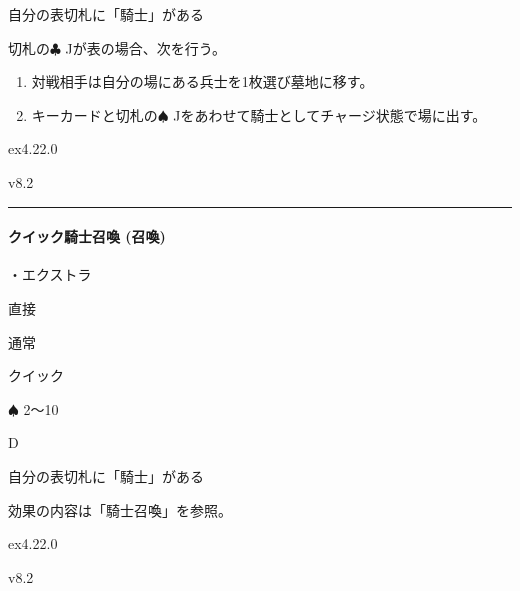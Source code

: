 \documentclass[letterpaper,10pt,dvipdfmx]{sphinxmanual}
\begin{document}
\sphinxAtStartPar
自分の表切札に「騎士」がある

\sphinxAtStartPar
{}

\sphinxAtStartPar
切札の{\normalsize $\clubsuit$} Jが表の場合、次を行う。
\begin{enumerate}
%
\item {} 
\sphinxAtStartPar
対戦相手は自分の場にある兵士を1枚選び墓地に移す。

\item {} 
\sphinxAtStartPar
キーカードと切札の{\normalsize $\spadesuit$} Jをあわせて騎士としてチャージ状態で場に出す。

\end{enumerate}

\sphinxAtStartPar
{}  ex4.22.0

\sphinxAtStartPar
{}  v8.2


\bigskip\hrule\bigskip



\paragraph{クイック騎士召喚 (召喚)}
\label{\detokenize{auto/frameActionlist:act-quicksummonknight}}\label{\detokenize{auto/frameActionlist:id82}}
\sphinxAtStartPar
{}

\sphinxAtStartPar
・エクストラ

\sphinxAtStartPar
{} 直接

\sphinxAtStartPar
{} 通常

\sphinxAtStartPar
{} クイック

\sphinxAtStartPar
{} {\normalsize $\spadesuit$} 2〜10

\sphinxAtStartPar
{} D

\sphinxAtStartPar
{}

\sphinxAtStartPar
自分の表切札に「騎士」がある

\sphinxAtStartPar
{}

\sphinxAtStartPar
効果の内容は「騎士召喚」を参照。

\sphinxAtStartPar
{}  ex4.22.0

\sphinxAtStartPar
{}  v8.2
\end{document}
